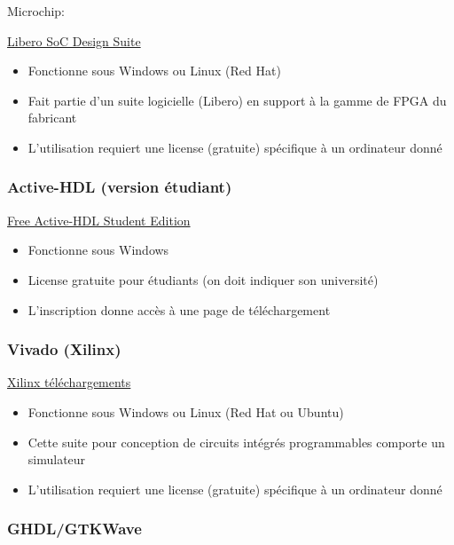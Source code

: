 \documentclass[11pt]{article}
\begin{document}
Microchip:

\href{https://www.microchip.com/en-us/products/fpgas-and-plds/fpga-and-soc-design-tools/fpga/libero-software-later-versions\#downloads}{Libero SoC Design Suite}

\begin{itemize}
\item Fonctionne sous Windows ou Linux (Red Hat)
\item Fait partie d'un suite logicielle (Libero) en support à la gamme de
FPGA du fabricant
\item L'utilisation requiert une license (gratuite) spécifique à un
ordinateur donné
\end{itemize}

\subsubsection{Active-HDL (version étudiant)}
\label{sec:orga317dd6}

\href{https://www.aldec.com/en/products/fpga\_simulation/active\_hdl\_student}{Free Active-HDL Student Edition}

\begin{itemize}
\item Fonctionne sous Windows
\item License gratuite pour étudiants (on doit indiquer son université)
\item L'inscription donne accès à une page de téléchargement
\end{itemize}

\subsubsection{Vivado (Xilinx)}
\label{sec:org45668d3}

\href{https://www.xilinx.com/support/download.html}{Xilinx téléchargements}

\begin{itemize}
\item Fonctionne sous Windows ou Linux (Red Hat ou Ubuntu)
\item Cette suite pour conception de circuits intégrés programmables
comporte un simulateur
\item L'utilisation requiert une license (gratuite) spécifique à un
ordinateur donné
\end{itemize}

\subsubsection{GHDL/GTKWave}
\label{sec:orgd918fcc}
\end{document}
